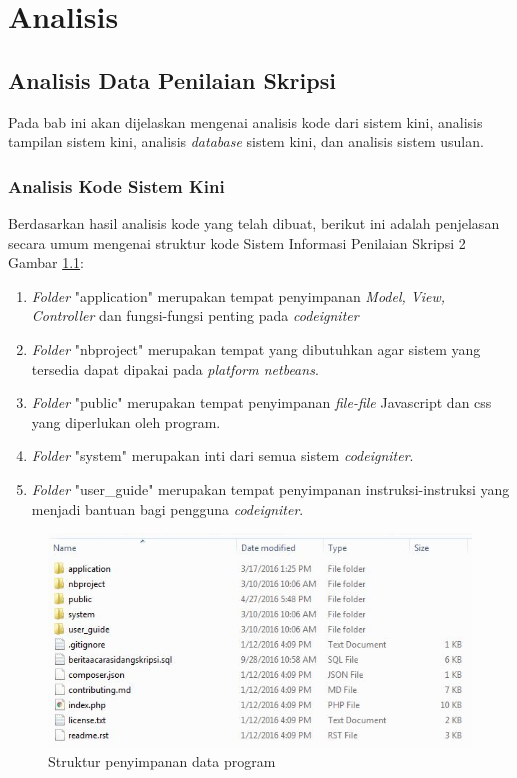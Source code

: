 \chapter{Analisis}
\label{chap: analisis}

\section{Analisis Data Penilaian Skripsi}
\label{sec: analisisData}

	Pada bab ini akan dijelaskan mengenai analisis kode dari sistem kini, analisis tampilan sistem kini, analisis \textit{database} sistem kini, dan analisis sistem usulan.
	
	\subsection{Analisis Kode Sistem Kini}
	\label{sec: analisisKode}
	
		Berdasarkan hasil analisis kode yang telah dibuat, berikut ini adalah penjelasan secara umum mengenai struktur kode Sistem Informasi Penilaian Skripsi 2 Gambar \ref{fig:strukturFile}:
		
		\begin{enumerate}
			\item \textit{Folder} "application" merupakan tempat penyimpanan \textit{Model, View, Controller} dan fungsi-fungsi penting pada \textit{codeigniter}
			\item \textit{Folder} "nbproject" merupakan tempat yang dibutuhkan agar sistem yang tersedia dapat dipakai pada \textit{platform netbeans}. 
			\item \textit{Folder} "public" merupakan tempat penyimpanan \textit{file-file} Javascript dan css yang diperlukan oleh program.
			\item \textit{Folder} "system" merupakan inti dari semua sistem \textit{codeigniter}.
			\item \textit{Folder} "user\_guide" merupakan tempat penyimpanan instruksi-instruksi yang menjadi bantuan bagi pengguna \textit{codeigniter}.
		\end{enumerate}
		
		\begin{figure}[H]
			\centering
			\includegraphics[scale= 1.0]{Gambar/strukturFile}
			\caption {Struktur penyimpanan data program}
			\label{fig:strukturFile}
		\end{figure}
		

